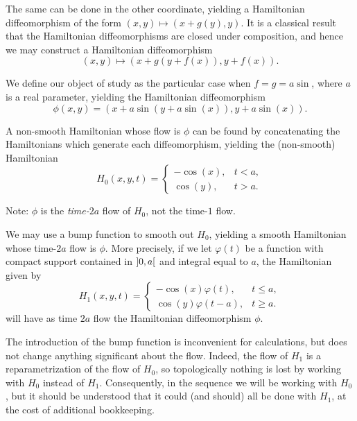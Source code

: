 The same can be done in the other coordinate, yielding a Hamiltonian diffeomorphism of the form $(x,y) \mapsto (x + g(y), y)$. It is a classical result that the Hamiltonian diffeomorphisms are closed under composition, and hence we may construct a Hamiltonian diffeomorphism
\begin{equation}
(x,y) \mapsto (x + g(y+f(x)), y+f(x)).
\end{equation}

We define our object of study as the particular case when $f = g = a \sin$, where $a$ is a real parameter, yielding the Hamiltonian diffeomorphism
\begin{equation}\label{eq:phi1def}
\phi(x,y) = ( x + a \sin(y + a \sin(x)), y + a \sin(x)).
\end{equation}

A non-smooth Hamiltonian whose flow is $\phi$ can be found by concatenating the Hamiltonians which generate each diffeomorphism, yielding the (non-smooth) Hamiltonian
\begin{equation}
H_0(x,y,t) = \begin{cases}
-\cos(x), & t < a,\\
\cos(y), & t > a.
\end{cases}
\end{equation}

Note: $\phi$ is the \emph{time-$2a$} flow of $H_0$, not the time-$1$ flow.

We may use a bump function to smooth out $H_0$, yielding a smooth Hamiltonian whose time-$2a$ flow is $\phi$. More precisely, if we let $\varphi(t)$ be a function with compact support contained in $\ointerval 0 a$ and integral equal to $a$, the Hamiltonian given by
\begin{equation}
\label{h1def}
H_1(x,y,t) = \begin{cases}
-\cos(x) \varphi(t), & t \leq a,\\
\cos(y) \varphi(t-a), & t \geq a.
\end{cases}
\end{equation}
will have as time $2a$ flow the Hamiltonian diffeomorphism $\phi$.

The introduction of the bump function is inconvenient for calculations, but does not change anything significant about the flow. Indeed, the flow of $H_1$ is a reparametrization of the flow of $H_0$, so topologically nothing is lost by working with $H_0$ instead of $H_1$. Consequently, in the sequence we will be working with $H_0$, but it should be understood that it could (and should) all be done with $H_1$, at the cost of additional bookkeeping.


